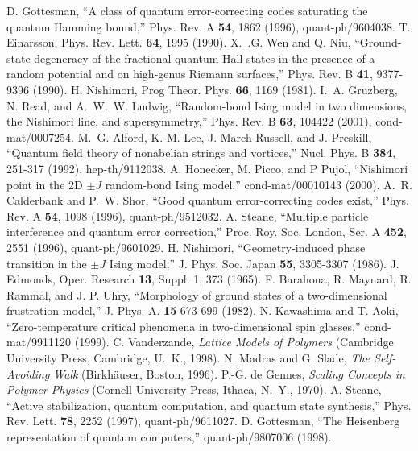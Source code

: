 \begin{references}
 D. Gottesman, ``A class of quantum error-correcting codes saturating the quantum Hamming bound,'' Phys. Rev. A {\bf 54}, 1862 (1996), quant-ph/9604038.
 T. Einarsson, Phys. Rev. Lett. {\bf 64}, 1995 (1990).
 X.~.G. Wen and Q. Niu, ``Ground-state degeneracy of the fractional quantum Hall states in the presence of a random potential and on high-genus Riemann surfaces,'' Phys. Rev. B {\bf 41}, 9377-9396 (1990).
 H. Nishimori, Prog Theor. Phys. {\bf 66}, 1169 (1981).
 I.~A. Gruzberg, N. Read, and A.~W.~W. Ludwig, ``Random-bond Ising model in two dimensions, the Nishimori line, and supersymmetry,'' Phys. Rev. B {\bf 63}, 104422 (2001), cond-mat/0007254.
 M.~G. Alford, K.-M. Lee, J. March-Russell, and J. Preskill, ``Quantum field theory of nonabelian strings and vortices,'' Nucl. Phys. B {\bf 384}, 251-317 (1992), hep-th/9112038.
 A. Honecker, M. Picco, and P Pujol, ``Nishimori point in the 2D $\pm J$ random-bond Ising model,'' cond-mat/00010143 (2000).
 A.~R. Calderbank and P.~W. Shor, ``Good quantum error-correcting codes exist,'' Phys. Rev. A {\bf 54}, 1098 (1996), quant-ph/9512032.
 A. Steane, ``Multiple particle interference and quantum error correction,'' Proc. Roy. Soc. London, Ser. A {\bf 452}, 2551 (1996), quant-ph/9601029.
 H. Nishimori, ``Geometry-induced phase transition in the $\pm J$ Ising model,'' J. Phys. Soc. Japan {\bf 55}, 3305-3307 (1986).
 J. Edmonds, Oper. Research {\bf 13}, Suppl. 1, 373 (1965).
 F. Barahona, R. Maynard, R. Rammal, and J. P. Uhry, ``Morphology of ground states of a two-dimensional frustration model,'' J. Phys. A. {\bf 15} 673-699 (1982).
 N. Kawashima and T. Aoki, ``Zero-temperature critical phenomena in two-dimensional spin glasses,'' cond-mat/9911120 (1999).
 C. Vanderzande, {\it Lattice Models of Polymers}
(Cambridge University Press, Cambridge, U.~K., 1998).
 N. Madras and G. Slade, {\it The Self-Avoiding Walk}
(Birkh\"auser, Boston, 1996).
 P.-G. de Gennes, {\it Scaling Concepts in Polymer Physics}
(Cornell University Press, Ithaca, N.~Y., 1970).
 A. Steane, ``Active stabilization, quantum computation, and quantum state synthesis,'' Phys. Rev. Lett. {\bf 78}, 2252 (1997), quant-ph/9611027.
 D. Gottesman, ``The Heisenberg representation of quantum computers,'' quant-ph/9807006 (1998).

\end{references}

